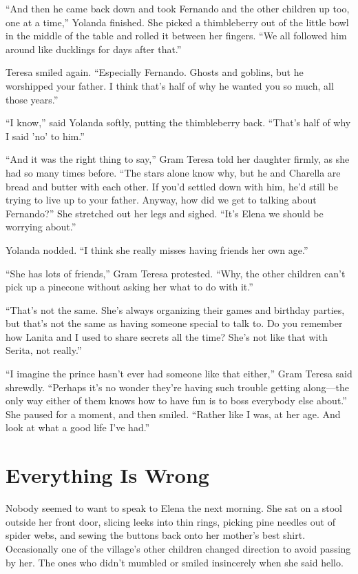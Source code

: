 \documentclass[10pt]{book}
\begin{document}
``And then he came back down and took Fernando and the other children up too, one at a time,'' Yolanda finished. She picked a thimbleberry out of the little bowl in the middle of the table and rolled it between her fingers. ``We all followed him around like ducklings for days after that.''

Teresa smiled again. ``Especially Fernando. Ghosts and goblins, but he worshipped your father. I think that's half of why he wanted you so much, all those years.''

``I know,'' said Yolanda softly, putting the thimbleberry back. ``That's half of why I said 'no' to him.''

``And it was the right thing to say,'' Gram Teresa told her daughter firmly, as she had so many times before. ``The stars alone know why, but he and Charella are bread and butter with each other. If you'd settled down with him, he'd still be trying to live up to your father. Anyway, how did we get to talking about Fernando?'' She stretched out her legs and sighed. ``It's Elena we should be worrying about.''

Yolanda nodded. ``I think she really misses having friends her own age.''

``She has lots of friends,'' Gram Teresa protested. ``Why, the other children can't pick up a pinecone without asking her what to do with it.''

``That's not the same. She's always organizing their games and birthday parties, but that's not the same as having someone special to talk to. Do you remember how Lanita and I used to share secrets all the time? She's not like that with Serita, not really.''

``I imagine the prince hasn't ever had someone like that either,'' Gram Teresa said shrewdly. ``Perhaps it's no wonder they're having such trouble getting along---the only way either of them knows how to have fun is to boss everybody else about.'' She paused for a moment, and then smiled. ``Rather like I was, at her age. And look at what a good life I've had.''

\chapter{Everything Is Wrong}

Nobody seemed to want to speak to Elena the next morning. She sat on a stool outside her front door, slicing leeks into thin rings, picking pine needles out of spider webs, and sewing the buttons back onto her mother's best shirt. Occasionally one of the village's other children changed direction to avoid passing by her. The ones who didn't mumbled or smiled insincerely when she said hello.
\end{document}
